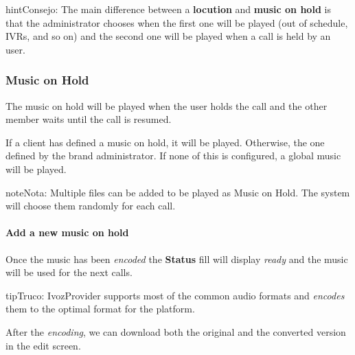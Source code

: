 \documentclass[letterpaper,10pt,spanish]{sphinxmanual}
\begin{document}
\begin{notice}{hint}{Consejo:}
The main difference between a \textbf{locution} and \textbf{music on hold} is
that the administrator chooses when the first one will be played (out of
schedule, IVRs, and so on) and the second one will be played when a call is
held by an user.
\end{notice}
\label{administration_portal/client/vpbx/multimedia/music_on_hold:musiconhold}

\subsubsection{Music on Hold}
\label{administration_portal/client/vpbx/multimedia/music_on_hold:music-on-hold}\label{administration_portal/client/vpbx/multimedia/music_on_hold::doc}\label{administration_portal/client/vpbx/multimedia/music_on_hold:musiconhold}\label{administration_portal/client/vpbx/multimedia/music_on_hold:id1}
The music on hold will be played when the user holds the call and the other
member waits until the call is resumed.

If a client has defined a music on hold, it will be played. Otherwise, the
one defined by the brand administrator. If none of this is configured, a global
music will be played.

\begin{notice}{note}{Nota:}
Multiple files can be added to be played as Music on Hold. The system
will choose them randomly for each call.
\end{notice}
\paragraph{Add a new music on hold}

Once the music has been \emph{encoded} the \textbf{Status} fill will display \emph{ready} and
the music will be used for the next calls.

\begin{notice}{tip}{Truco:}
IvozProvider supports most of the common audio formats and \emph{encodes}
them to the optimal format for the platform.
\end{notice}

After the \emph{encoding}, we can download both the original and the converted
version in the edit screen.
\label{administration_portal/client/vpbx/faxes:faxing-system}
\end{document}
